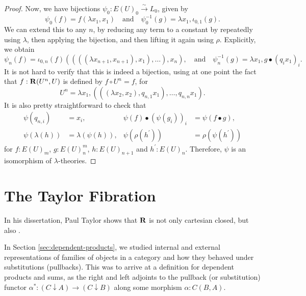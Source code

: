 \begin{proof}
  Now, we have bijections $ \psi_0: E(U)_0 \xrightarrow{\sim} L_0 $, given by
  \[ \psi_0(f) = f (\lambda x_1, x_1) \quad \text{and} \quad \psi_0^{-1}(g) = \lambda x_1, \iota_{0, 1}(g). \]
  We can extend this to any $ n $, by reducing any term to a constant by repeatedly using $ \lambda $, then applying the bijection, and then lifting it again using $ \rho $. Explicitly, we obtain
  \[ \psi_n(f) = \iota_{0, n}(f) ((((\lambda x_{n+1}, x_{n+1}), x_1), \dots), x_n), \quad \text{and} \quad \psi^{-1}_n(g) = \lambda x_1, g \bullet (q_i x_1)_i. \]
  It is not hard to verify that this is indeed a bijection, using at one point the fact that $ f: \mathbf{R}(U^n, U) $ is defined by $ f \circ U^n = f $, for
  \[ U^n = \lambda x_1, (((\lambda x_2, x_2), q_{n, 1} x_1 ), \dots, q_{n, n} x_1 ). \]
  It is also pretty straightforward to check that
  \begin{align*}
    \psi(q_{n, i}) &= x_i, & \psi(f) \bullet (\psi(g_i))_i &= \psi(f \bullet g),\\
    \psi(\lambda(h)) &= \lambda(\psi(h)), & \psi(\rho(h^\prime)) &= \rho(\psi(h^\prime))
  \end{align*}
  for $ f: E(U)_m $, $ g: E(U)_n^m $, $ h: E(U)_{n + 1} $ and $ h^\prime : E(U)_n $. Therefore, $ \psi $ is an isomorphism of $ \lambda $-theories.
\end{proof}

\section{The Taylor Fibration}

In his dissertation, Paul Taylor shows that $ \mathbf{R} $ is not only cartesian closed, but also .

In Section \ref{sec:dependent-products}, we studied internal and external representations of families of objects in a category and how they behaved under substitutions (pullbacks). This was to arrive at a definition for dependent products and sums, as the right and left adjoints to the pullback (or substitution) functor $ \alpha^*: (C \downarrow A) \to (C \downarrow B) $ along some morphism $ \alpha : C(B, A) $.


